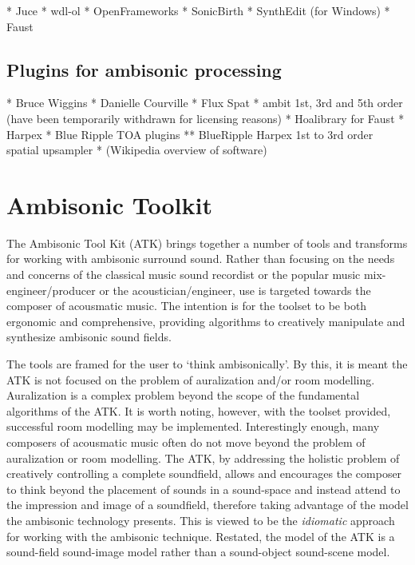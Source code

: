 \documentclass{article}
\begin{document}
* Juce
* wdl-ol
* OpenFrameworks
* SonicBirth
* SynthEdit (for Windows)
* Faust


\subsection{Plugins for ambisonic processing}\label{sec:ambi-plugins}

* Bruce Wiggins
* Danielle Courville
* Flux Spat
* ambit 1st, 3rd and 5th order (have been temporarily withdrawn for licensing reasons)
* Hoalibrary for Faust
* Harpex
* Blue Ripple TOA plugins
** BlueRipple Harpex 1st to 3rd order spatial upsampler
* (Wikipedia overview of software)




\section{Ambisonic Toolkit}

The Ambisonic Tool Kit (ATK) brings together a number of tools and transforms for working with ambisonic surround sound.
Rather than focusing on the needs and concerns of the classical music sound recordist or the popular music mix-engineer/producer or the acoustician/engineer, use is targeted towards the composer of acousmatic music.
The intention is for the toolset to be both ergonomic and comprehensive, providing algorithms to creatively manipulate and synthesize ambisonic sound fields.

The tools are framed for the user to `think ambisonically'.
By this, it is meant the ATK is not focused on the problem of auralization and/or room modelling.
Auralization is a complex problem beyond the scope of the fundamental algorithms of the ATK.
It is worth noting, however, with the toolset provided, successful room modelling may be implemented.
Interestingly enough, many composers of acousmatic music often do not move beyond the problem of auralization or room modelling.
The ATK, by addressing the holistic problem of creatively controlling a complete soundfield, allows and encourages the composer to think beyond the placement of sounds in a sound-space and instead attend to the impression and image of a soundfield, therefore taking advantage of the model the ambisonic technology presents.
This is viewed to be the {\em idiomatic} approach for working with the ambisonic technique.
Restated, the model of the ATK is a sound-field sound-image model rather than a sound-object sound-scene model.
\end{document}
